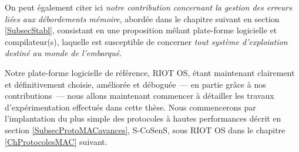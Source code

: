 On peut également citer ici \emph{notre contribution concernant
la gestion des erreurs liées aux débordements mémoire}, abordée dans
le chapitre suivant en section \vref{SubsecStabl}, consistant en
une proposition mêlant plate-forme logicielle et compilateur(s),
laquelle est susceptible de concerner \emph{tout système d'exploiation
destiné au monde de l'embarqué}.

\bigskip

Notre plate-forme logicielle de référence, RIOT OS, étant maintenant
clairement et définitivement choisie, améliorée et déboguée~--- en partie
grâce à nos contributions~--- nous allons maintenant commencer à détailler
les  travaux d'expérimentation effectués dans cette thèse. Nous commencerons
par l'implantation du plus simple des protocoles à hautes performances
décrit en section \vref{SubsecProtoMACavances}, S-CoSenS, sous RIOT OS
dans le chapitre \ref{ChProtocolesMAC} suivant.




